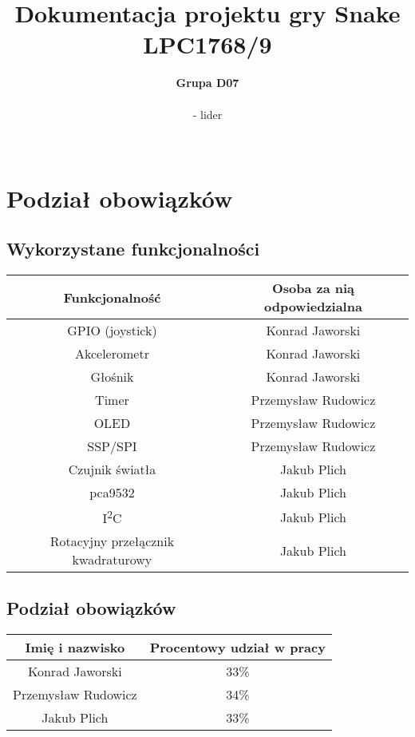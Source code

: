\documentclass{classrep}
\author{%
	\textbf{Grupa D07}\\\\
	\studentinfo[216879@edu.p.lodz.pl]{Przemysław Rudowicz}{216879} - lider\\
	\studentinfo[216782@edu.p.lodz.pl]{Konrad Jaworski}{216782}\\
	\studentinfo[216866@edu.p.lodz.pl]{Jakub Plich}{216866}%
}
\title{Dokumentacja projektu gry Snake\\
		LPC1768/9}
\begin{document}
	\thispagestyle{fancyplain}
	\maketitle
	

	
	\newpage
	\tableofcontents
	\newpage
	
	\section{Podział obowiązków}
	{
	\subsection{Wykorzystane funkcjonalności}
		\begin{center}
			\begin{tabular}{|c|c|}
				\hline 
				\textbf{Funkcjonalność} & \textbf{Osoba za nią odpowiedzialna} \\ 
				\hline 
				GPIO (joystick) & Konrad Jaworski \\ 
				\hline 
				Akcelerometr & Konrad Jaworski \\ 
				\hline 
				Głośnik & Konrad Jaworski \\ 
				\hline 
				Timer & Przemysław Rudowicz \\ 
				\hline 
				OLED & Przemysław Rudowicz \\ 
				\hline 
				SSP/SPI & Przemysław Rudowicz \\ 
				\hline 
				Czujnik światła & Jakub Plich \\ 
				\hline 
				pca9532 & Jakub Plich \\ 
				\hline 
				I\textsuperscript{2}C & Jakub Plich \\ 
				\hline 
				Rotacyjny przełącznik kwadraturowy & Jakub Plich\\
				\hline
			\end{tabular} 	
		\end{center}
	}


	\subsection{Podział obowiązków}
\begin{center}
			\begin{tabular}{|c|c|}
			\hline 
			\textbf{Imię i nazwisko} & \textbf{Procentowy udział w pracy} \\ 
			\hline 
			Konrad Jaworski & 33\% \\ 
			\hline 
			Przemysław Rudowicz & 34\% \\ 
			\hline 
			Jakub Plich & 33\% \\ 
			\hline 
		\end{tabular} 
\end{center}
\newpage
\end{document}
